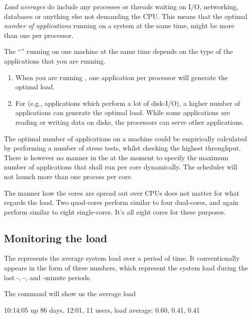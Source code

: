 \emph{Load averages} do include any processes or threads waiting on I/O,
networking, databases or anything else not demanding the CPU.
This means that the optimal
\emph{number of applications} running on a system at the same time, might be
more than one per processor.

The ``'' running on one machine at the
same time depends on the type of the applications that you are running.

\begin{enumerate}
\item  When you are running , one
  application per processor will generate the optimal load.
\item  For  (e.g., applications which perform
  a lot of disk-I/O), a higher number of applications can generate the optimal
  load. While some applications are reading or writing data on disks, the
  processors can serve other applications.
\end{enumerate}

The optimal number of applications on a machine could be empirically calculated
by performing a number of stress tests, whilst checking the highest throughput.
There is however no manner in the \hpc at the moment to specify the maximum
number of applications that shall run per core dynamically. The \hpc scheduler
will not launch more than one process per core.

The manner how the cores are spread out over CPUs does not matter for what
regards the load. Two quad-cores perform similar to four dual-cores, and again
perform similar to eight single-cores. It's all eight cores for these purposes.

\subsection{Monitoring the load}

The  represents the average system load over a period of
time. It conventionally appears in the form of three numbers, which represent
the system load during the last -, -, and
-minute periods.

The  command will show us the average load

\begin{prompt}
10:14:05 up 86 days, 12:01, 11 users, load average: 0.60, 0.41, 0.41
\end{prompt}


